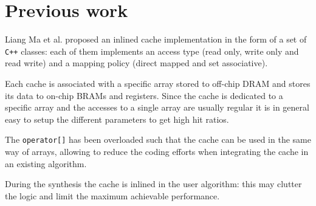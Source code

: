 \documentclass[11pt,a4paper]{memoir}
\begin{document}

\section{Previous work}\label{sec:liang}
Liang Ma et al. proposed an inlined cache implementation \cite{liang} in the form
of a set of \texttt{C++} classes: each of them implements an access type (read
only, write only and read write) and a mapping policy (direct mapped and set
associative).

Each cache is associated with a specific array stored to off-chip DRAM and
stores its data to on-chip BRAMs and registers. Since the cache is dedicated to
a specific array and the accesses to a single array are usually regular it is in
general easy to setup the different parameters to get high hit ratios.

The \texttt{operator[]} has been overloaded such that the cache can be used in
the same way of arrays, allowing to reduce the coding efforts when integrating
the cache in an existing algorithm.

During the synthesis the cache is inlined in the user algorithm: this may
clutter the logic and limit the maximum achievable performance.
\end{document}
